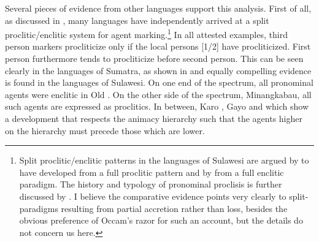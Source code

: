 \documentclass[output=paper]{langsci/langscibook}
\begin{document}
Several pieces of evidence from other  languages support this analysis. First of all, as discussed in \citet{Kaufman:2014a}, many  languages have independently arrived at a split proclitic/enclitic system for agent marking.\footnote{Split proclitic/enclitic patterns in the languages of Sulawesi are argued by \citet{Berg:1996} to have developed from a  full proclitic pattern and by \citet{Himmelmann:1996} from a full enclitic paradigm. The history and typology of pronominal proclisis is further discussed by \citet{Wolff:1996, Mead:2002, Kikusawa:2003, Billings:2004}. I believe the comparative evidence points very clearly to split-paradigms resulting from partial accretion rather than loss, besides the obvious preference of Occam's razor for such an account, but the details do not concern us here.} In all attested examples, third person markers procliticize only if the local persons [1/2] have procliticized. First person furthermore tends to procliticize before second person. This can be seen clearly in the languages of Sumatra, as shown in  and equally compelling evidence is found in the languages of Sulawesi. On one end of the spectrum, all pronominal agents were enclitic in Old . On the other side of the spectrum, Minangkabau, all such agents are expressed as proclitics. In between, Karo , Gayo and  which show a development that respects the animacy hierarchy such that the agents higher on the hierarchy must precede those which are lower. 
\end{document}

